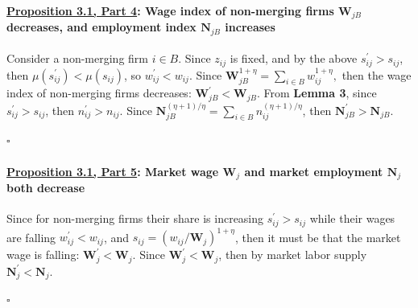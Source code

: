 \documentclass[12pt]{article}
\theoremstyle{prop}
\begin{document}
\bigskip

\paragraph{\underline{Proposition 3.1, Part 4}:  Wage index of non-merging firms $\mathbf{W}_{jB}$ decreases,
	and employment index $\mathbf{N}_{jB}$ increases}

Consider a non-merging firm $i\in B$. Since $z_{ij}$ is fixed, and
by the above $s_{ij}^{\prime}>s_{ij}$, then $\mu\left(s_{ij}^{\prime}\right)<\mu\left(s_{ij}\right)$,
so $w_{ij}^{\prime}<w_{ij}$. Since $\mathbf{W}_{jB}^{1+\eta}=\sum_{i\in B}w_{ij}^{1+\eta},$
then the wage index of non-merging firms decreases: $\mathbf{W}_{jB}^{\prime}<\mathbf{W}_{jB}$.
From \textbf{Lemma 3}, since $s_{ij}^{\prime}>s_{ij}$, then $n_{ij}^{\prime}>n_{ij}$.
Since $\mathbf{N}_{jB}^{(\eta+1)/\eta}=\sum_{i\in B}n_{ij}^{\left(\eta+1\right)/\eta}$,
then $\mathbf{N}_{jB}^{\prime}>\mathbf{N}_{jB}$.
 \begin{flushright}
      $\square$
 \end{flushright}


\bigskip

\paragraph{\underline{Proposition 3.1, Part 5}: Market wage $\mathbf{W}_{j}$ and market employment $\mathbf{N}_{j}$
	both decrease}

Since for non-merging firms their share is increasing $s_{ij}^{\prime}>s_{ij}$
while their wages are falling $w_{ij}^{\prime}<w_{ij}$, and $s_{ij}=\left(w_{ij}/\mathbf{W}_{j}\right)^{1+\eta}$,
then it must be that the market wage is falling: $\mathbf{W}_{j}^{\prime}<\mathbf{W}_{j}$.
Since $\mathbf{W}_{j}^{\prime}<\mathbf{W}_{j}$, then by market
labor supply $\mathbf{N}_{j}^{\prime}<\mathbf{N}_{j}$.
 \begin{flushright}
      $\square$
 \end{flushright}

\bigskip
\end{document}
